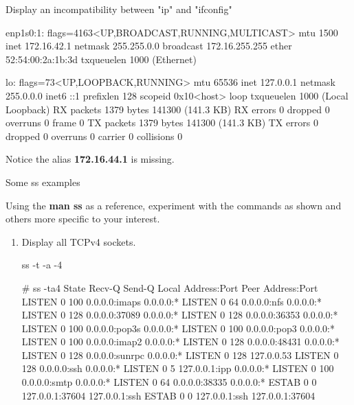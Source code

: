 \begin{Lab}
\begin{exe} {Display an incompatibility between "ip" and "ifconfig"}
\begin{sol}
\begin{enumerate}
\begin{raw}
enp1s0:1: flags=4163<UP,BROADCAST,RUNNING,MULTICAST>  mtu 1500
        inet 172.16.42.1  netmask 255.255.0.0  broadcast 172.16.255.255
        ether 52:54:00:2a:1b:3d  txqueuelen 1000  (Ethernet)

lo: flags=73<UP,LOOPBACK,RUNNING>  mtu 65536
        inet 127.0.0.1  netmask 255.0.0.0
        inet6 ::1  prefixlen 128  scopeid 0x10<host>
        loop  txqueuelen 1000  (Local Loopback)
        RX packets 1379  bytes 141300 (141.3 KB)
        RX errors 0  dropped 0  overruns 0  frame 0
        TX packets 1379  bytes 141300 (141.3 KB)
        TX errors 0  dropped 0 overruns 0  carrier 0  collisions 0
			\end{raw}

			Notice the alias \textbf{172.16.44.1} is missing. 
		\end{enumerate}

	\end{sol}
\end{exe}

\begin{exe}
	{Some ss examples}
		
	Using the \textbf{man ss} as a reference, experiment with 
	the commands as shown and others more specific to your interest. 

	\begin{enumerate}
		\item
		Display all TCPv4 sockets.
			\begin{raw}

ss -t -a -4 
			
# ss -ta4
State   Recv-Q    Send-Q        Local Address:Port         Peer Address:Port    
LISTEN  0         100                 0.0.0.0:imaps             0.0.0.0:*       
LISTEN  0         64                  0.0.0.0:nfs               0.0.0.0:*       
LISTEN  0         128                 0.0.0.0:37089             0.0.0.0:*       
LISTEN  0         128                 0.0.0.0:36353             0.0.0.0:*       
LISTEN  0         100                 0.0.0.0:pop3s             0.0.0.0:*       
LISTEN  0         100                 0.0.0.0:pop3              0.0.0.0:*       
LISTEN  0         100                 0.0.0.0:imap2             0.0.0.0:*       
LISTEN  0         128                 0.0.0.0:48431             0.0.0.0:*       
LISTEN  0         128                 0.0.0.0:sunrpc            0.0.0.0:*       
LISTEN  0         128           127.0.0.53%
LISTEN  0         128                 0.0.0.0:ssh               0.0.0.0:*       
LISTEN  0         5                 127.0.0.1:ipp               0.0.0.0:*       
LISTEN  0         100                 0.0.0.0:smtp              0.0.0.0:*       
LISTEN  0         64                  0.0.0.0:38335             0.0.0.0:*       
ESTAB   0         0                 127.0.0.1:37604           127.0.0.1:ssh     
ESTAB   0         0                 127.0.0.1:ssh             127.0.0.1:37604   


\end{raw}
\end{enumerate}
\end{exe}
\end{Lab}
